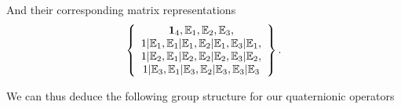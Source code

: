 \documentclass[a4paper,12pt]{book}
\begin{document}
And their corresponding matrix representations 
\begin{equation}
\left\{ 
\begin{array}{c}
\mathbf{1}_{4},\Bbb{E}_{1},\Bbb{E}_{2},\Bbb{E}_{3}, \\ 
1|\Bbb{E}_{1},\Bbb{E}_{1}|\Bbb{E}_{1},\Bbb{E}_{2}|\Bbb{E}_{1},\Bbb{E}_{3}|%
\Bbb{E}_{1}, \\ 
1|\Bbb{E}_{2},\Bbb{E}_{1}|\Bbb{E}_{2},\Bbb{E}_{2}|\Bbb{E}_{2},\Bbb{E}_{3}|%
\Bbb{E}_{2}, \\ 
1|\Bbb{E}_{3},\Bbb{E}_{1}|\Bbb{E}_{3},\Bbb{E}_{2}|\Bbb{E}_{3},\Bbb{E}_{3}|%
\Bbb{E}_{3}
\end{array}
\right\} .  \label{ml2}
\end{equation}

We can thus deduce the following group structure for our quaternionic
operators
\end{document}
